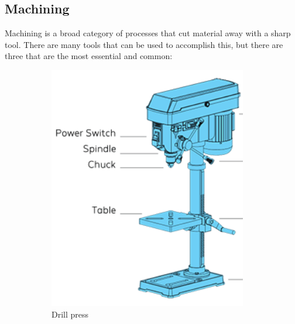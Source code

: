 \documentclass[10pt,letterpaper]{book}
\begin{document}
 \subsection{Machining}
 
 Machining is a broad category of processes that cut material away with a sharp tool. There are many tools that can be used to accomplish this, but there are three that are the most essential and common:
 
 \begin{figure}[H]
	\centering
	\begin{subfigure}[b]{.24\linewidth}
		\includegraphics[width=0.95\textwidth]{imgs/drillpress.png}
		\caption{Drill press}
	\end{subfigure}	\begin{subfigure}[b]{.34\linewidth}

\end{subfigure}
\end{figure}
\end{document}
